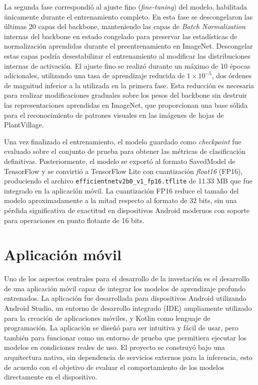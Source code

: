 La segunda fase correspondió al ajuste fino (\textit{fine-tuning}) del modelo, habilitada únicamente durante el entrenamiento
completo. En esta fase se descongelaron las últimas 20 capas del backbone, manteniendo las capas de \textit{Batch Normalization}
internas del backbone en estado congelado para preservar las estadísticas de normalización aprendidas durante el preentrenamiento
en ImageNet. Descongelar estas capas podría desestabilizar el entrenamiento al modificar las distribuciones internas de activación.
El ajuste fino se realizó durante un máximo de 10 épocas adicionales, utilizando una tasa de aprendizaje reducida de $1 \times
10^{-5}$, dos órdenes de magnitud inferior a la utilizada en la primera fase. Esta reducción es necesaria para realizar
modificaciones graduales sobre los pesos del backbone sin destruir las representaciones aprendidas en ImageNet, que proporcionan
una base sólida para el reconocimiento de patrones visuales en las imágenes de hojas de PlantVillage.

Una vez finalizado el entrenamiento, el modelo guardado como \textit{checkpoint} fue evaluado sobre el conjunto de prueba para
obtener las métricas de clasificación definitivas. Posteriormente, el modelo se exportó al formato SavedModel de TensorFlow y
se convirtió a TensorFlow Lite con cuantización \textit{float16} (FP16), produciendo el archivo \texttt{efficientnetv2b0\_v1\_fp16.tflite}
de 11.33 MB que fue integrado en la aplicación móvil. La cuantización FP16 reduce el tamaño del modelo aproximadamente a la
mitad respecto al formato de 32 bits, sin una pérdida significativa de exactitud en dispositivos Android modernos con soporte
para operaciones en punto flotante de 16 bits.

\section{Aplicación móvil}
Uno de los aspectos centrales para el desarrollo de la investación es el desarrollo de una aplicación móvil capaz de integrar 
los modelos de aprendizaje
profundo entrenados. La aplicación fue desarrollada para dispositivos Android utilizando Android Studio, un entorno de desarrollo
integrado (IDE) ampliamente utilizado para la creación de aplicaciones móviles, y Kotlin como lenguaje de programación. La aplicación se
diseñó para ser intuitiva y fácil de usar, pero también para funcionar como un entorno de prueba que permitiera ejecutar los modelos en
condiciones reales de uso. El proyecto se construyó bajo una arquitectura nativa, sin dependencia de servicios externos para la
inferencia, esto de acuerdo con el objetivo de evaluar el comportamiento de los modelos directamente en el dispositivo.

